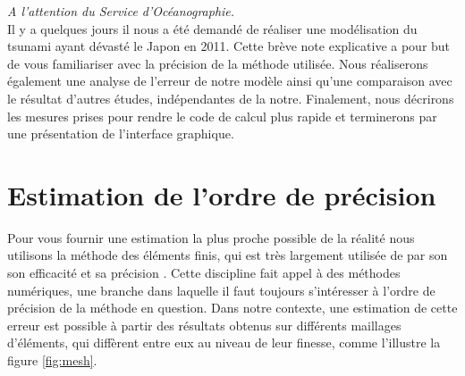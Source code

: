 \documentclass[a4paper,11pt]{article}
\begin{document}
\tableofcontents

\vspace{10mm}
\textit{A l'attention du Service d'Océanographie.}\\

Il y a quelques jours il nous a été demandé de réaliser une modélisation du tsunami ayant dévasté le Japon en 2011. Cette brève note explicative a pour but de vous familiariser avec la précision de la méthode utilisée. Nous réaliserons également une analyse de l'erreur de notre modèle ainsi qu'une comparaison avec le résultat d'autres études, indépendantes de la notre. Finalement, nous décrirons les mesures prises pour rendre le code de calcul plus rapide et terminerons par une présentation de l'interface graphique.\\

\section{Estimation de l'ordre de précision}
\label{sec:error}

Pour vous fournir une estimation la plus proche possible de la réalité nous utilisons la méthode des éléments finis, qui est très largement utilisée de par son son efficacité et sa précision \cite{FEM}. Cette discipline fait appel à des méthodes numériques, une branche dans laquelle il faut toujours s'intéresser à l'ordre de précision de la méthode en question. Dans notre contexte, une estimation de cette erreur est possible à partir des résultats obtenus sur différents maillages d'éléments, qui diffèrent entre eux au niveau de leur finesse, comme l'illustre la figure \ref{fig:mesh}.\\
\end{document}
